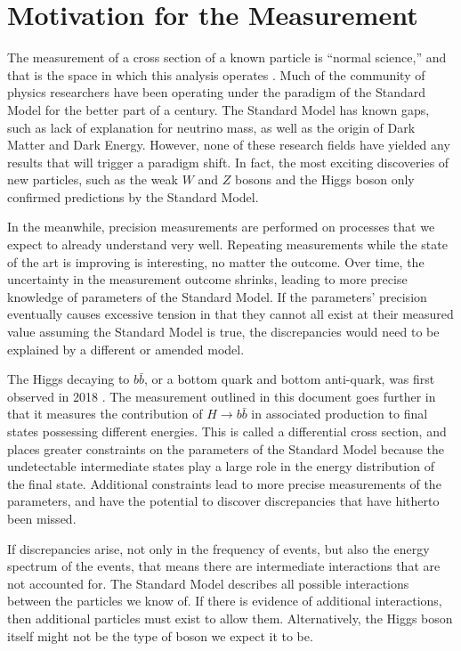 \section{Motivation for the Measurement}

The measurement of a cross section of a known particle is ``normal science,''
and that is the space in which this analysis operates \cite{Kuhn:1970}.
Much of the community of physics researchers have been operating under the paradigm
of the Standard Model \cite{PhysRevLett.19.1264} for the better part of a century.
The Standard Model has known gaps,
such as lack of explanation for neutrino mass,
as well as the origin of Dark Matter and Dark Energy.
However, none of these research fields have yielded any results
that will trigger a paradigm shift.
In fact, the most exciting discoveries of new particles,
such as the weak $W$ \cite{PhysRevLett.50.1738} and $Z$ \cite{dau1983ua1}
bosons and the Higgs boson \cite{Chatrchyan_2012,PhysRevD.86.032003} only confirmed
predictions by the Standard Model.

In the meanwhile, precision measurements are performed on
processes that we expect to already understand very well.
Repeating measurements while the state of the art is improving is interesting,
no matter the outcome.
Over time, the uncertainty in the measurement outcome shrinks,
leading to more precise knowledge of parameters of the Standard Model.
If the parameters' precision eventually causes excessive tension in that they cannot all exist
at their measured value assuming the Standard Model is true,
the discrepancies would need to be explained by a different or amended model.

The Higgs decaying to $b\bar{b}$, or a bottom quark and bottom anti-quark,
was first observed in 2018 \cite{obs-18, Aaboud_2018}.
The measurement outlined in this document goes further in that
it measures the contribution of $H \rightarrow b\bar{b}$ in associated production
to final states possessing different energies.
This is called a differential cross section,
and places greater constraints on the parameters of the Standard Model because
the undetectable intermediate states play a large role in the energy distribution of the final state.
Additional constraints lead to more precise measurements of the parameters,
and have the potential to discover discrepancies that have hitherto been missed.

If discrepancies arise, not only in the frequency of events,
but also the energy spectrum of the events,
that means there are intermediate interactions that are not accounted for.
The Standard Model describes all possible interactions between the particles we know of.
If there is evidence of additional interactions, then additional particles must exist to allow them.
Alternatively, the Higgs boson itself might not be the type of boson we expect it to be.

